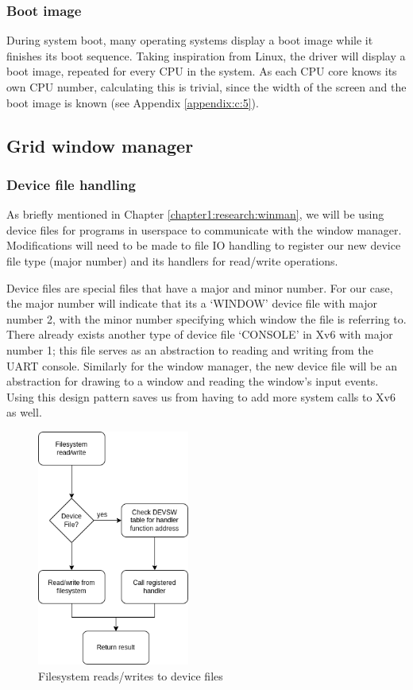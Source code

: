 \subsubsection{Boot image}
During system boot, many operating systems display a boot image while it finishes its
boot sequence. Taking inspiration from Linux, the driver will display a boot image, repeated
for every CPU in the system. As each CPU core knows its own CPU number, 
calculating this is trivial, since the width of the screen
and the boot image is known (see Appendix \ref{appendix:c:5}).

\subsection{Grid window manager}
\label{chapter2:impl:winman}

\subsubsection{Device file handling}
As briefly mentioned in Chapter \ref{chapter1:research:winman}, we will be using device files
for programs in userspace to communicate with the window manager. Modifications will need to be
made to file IO handling to register our new device file type (major number) and its handlers
for read/write operations.

Device files are special files that have a major and minor number. For our case,
the major number will indicate that its a `WINDOW' device file with major number 2, with 
the minor number specifying which window the file is referring to. There already
exists another type of device file `CONSOLE' in Xv6 with major number 1; this file serves as an
abstraction to reading and writing from the UART console. Similarly for the
window manager, the new device file will be an abstraction for drawing to a window
and reading the window's input events. Using this design pattern saves us from having
to add more system calls to Xv6 as well.

\begin{figure}[H]
    \centering
    \includegraphics[width=5cm]{fio.drawio.png}
    \caption{Filesystem reads/writes to device files}
\end{figure}

